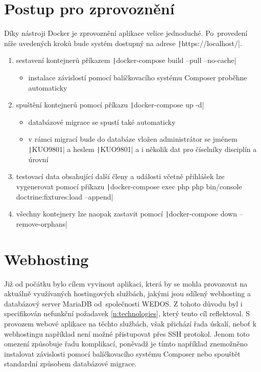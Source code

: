 \section{Postup pro zprovoznění}\label{deploy-steps}
Díky nástroji Docker je zprovoznění aplikace velice jednoduché. Po~provedení níže uvedených kroků bude systém dostupný na adrese \texttt|https://localhost/|.

\begin{enumerate}
	\item sestavení kontejnerů příkazem \texttt|docker-compose build --pull --no-cache|
	\begin{itemize}[topsep=0pt]
		\item instalace závislostí pomocí balíčkovacího systému Composer proběhne automaticky
	\end{itemize}
	\item spuštění kontejnerů pomocí příkazu \texttt|docker-compose up -d|
	\begin{itemize}[topsep=0pt]
		\item databázové migrace se spustí také automaticky
		\item v rámci migrací bude do databáze vložen administrátor se jménem \texttt|KUO9801| a heslem \texttt|KUO9801| a i několik dat pro číselníky disciplín a úrovní
	\end{itemize}
	\item testovací data obsahující další členy a události včetně přihlášek lze vygenerovat pomocí příkazu \texttt|docker-compose exec php php bin/console doctrine:fixtures:load --append|
	\item všechny kontejnery lze naopak zastavit pomocí \texttt|docker-compose down --remove-orphans|
\end{enumerate}

\section{Webhosting}
Již od počátku bylo cílem vyvinout aplikaci, která by se mohla provozovat na aktuálně využívaných hostingových službách, jakými jsou sdílený webhosting a databázový server MariaDB od~společnosti WEDOS. Z tohoto důvodu byl i specifikován nefunkční požadavek \ref{n:technologies}, který tento cíl reflektoval. S provozem webové aplikace na těchto službách, však přichází řada úskalí, neboť k webhostingu například není možné přistupovat přes SSH protokol. Jenom toto omezení způsobuje řadu komplikací, poněvadž je tímto například znemožněno instalovat závislosti pomocí balíčkovacího systému Composer nebo spouštět standardní způsobem databázové migrace.

